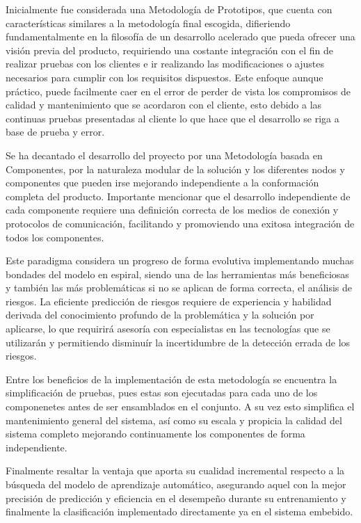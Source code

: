 \hfill \break
\justifying
Inicialmente fue considerada una Metodología de Prototipos, que cuenta con características similares a la metodología final escogida, difieriendo fundamentalmente en la filosofía de un desarrollo acelerado que pueda ofrecer una visión previa del producto, requiriendo una costante integración con el fin de realizar pruebas con los clientes e ir realizando las modificaciones o ajustes necesarios para cumplir con los requisitos dispuestos. Este enfoque aunque práctico, puede facilmente caer en el error de perder de vista los compromisos de calidad y mantenimiento que se acordaron con el cliente, esto debido a las continuas pruebas presentadas al cliente lo que hace que el desarrollo se riga a base de prueba y error.

\hfill \break
\justifying
Se ha decantado el desarrollo del proyecto por una Metodología basada en Componentes, por la naturaleza modular de la solución y los diferentes nodos y componentes que pueden irse mejorando independiente a la conformación completa del producto. Importante mencionar que el desarrollo independiente de cada componente requiere una definición correcta de los medios de conexión y protocolos de comunicación, facilitando y promoviendo una exitosa integración de todos los componentes.

\hfill \break
\justifying
Este paradigma considera un progreso de forma evolutiva implementando muchas bondades del modelo en espiral, siendo una de las herramientas más beneficiosas y también las más problemáticas si no se aplican de forma correcta, el análisis de riesgos. La eficiente predicción de riesgos requiere de experiencia y habilidad derivada del conocimiento profundo de la problemática y la solución por aplicarse, lo que requirirá asesoría con especialistas en las tecnologías que se utilizarán y permitiendo disminuír la incertidumbre de la detección errada de los riesgos.

\hfill \break
\justifying
Entre los beneficios de la implementación de esta metodología se encuentra la simplificación de pruebas, pues estas son ejecutadas para cada uno de los componenetes antes de ser ensamblados en el conjunto. A su vez esto simplifica el mantenimiento general del sistema, así como su escala y propicia la calidad del sistema completo mejorando continuamente los componentes de forma independiente.

\hfill \break
\justifying
Finalmente resaltar la ventaja que aporta su cualidad incremental respecto a la búsqueda del modelo de aprendizaje automático, asegurando aquel con la mejor precisión de predicción y eficiencia en el desempeño durante su entrenamiento y finalmente la clasificación implementado directamente ya en el sistema embebido.


